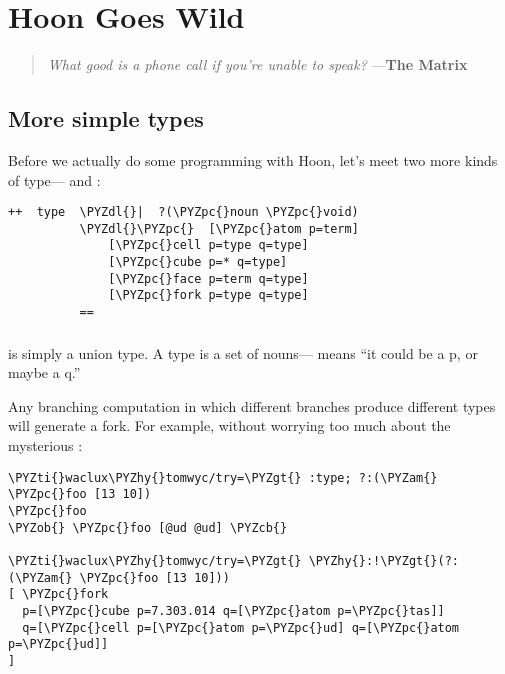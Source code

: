 \chapter{Hoon Goes Wild}

\begin{quote}
\emph{What good is a phone call if you're unable to speak?}
\medskip \newline
---\textbf{The Matrix}
\end{quote}

\section{More simple types}

Before we actually do some programming with Hoon, let's meet two
more kinds of type--- and :

\begin{framed_shaded}
\begin{Verbatim}[fontsize=\relsize{-2.5},fontseries=b,commandchars=\\\{\}]
++  type  \PYZdl{}|  ?(\PYZpc{}noun \PYZpc{}void)
          \PYZdl{}\PYZpc{}  [\PYZpc{}atom p=term]
              [\PYZpc{}cell p=type q=type]
              [\PYZpc{}cube p=* q=type]
              [\PYZpc{}face p=term q=type]
              [\PYZpc{}fork p=type q=type]
          ==
\end{Verbatim}
\end{framed_shaded}

\subsection{}

 is simply a union type.  A type is a set of nouns---
\kode{[\%fork p q]} means ``it could be a p, or maybe a q.''

Any branching computation in which different branches produce
different types will generate a fork.  For example, without
worrying too much about the mysterious :

\begin{framed_shaded}
\begin{Verbatim}[fontsize=\relsize{-2.5},fontseries=b,commandchars=\\\{\}]
\PYZti{}waclux\PYZhy{}tomwyc/try=\PYZgt{} :type; ?:(\PYZam{} \PYZpc{}foo [13 10])
\PYZpc{}foo
\PYZob{} \PYZpc{}foo [@ud @ud] \PYZcb{}

\PYZti{}waclux\PYZhy{}tomwyc/try=\PYZgt{} \PYZhy{}:!\PYZgt{}(?:(\PYZam{} \PYZpc{}foo [13 10]))
[ \PYZpc{}fork
  p=[\PYZpc{}cube p=7.303.014 q=[\PYZpc{}atom p=\PYZpc{}tas]]
  q=[\PYZpc{}cell p=[\PYZpc{}atom p=\PYZpc{}ud] q=[\PYZpc{}atom p=\PYZpc{}ud]]
]
\end{Verbatim}
\end{framed_shaded}

